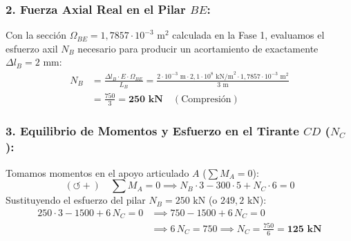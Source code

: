 \subsubsection*{2. Fuerza Axial Real en el Pilar $BE$:}
Con la sección $\Omega_{BE} = 1{,}7857 \cdot 10^{-3}\text{ m}^2$ calculada en la Fase 1, evaluamos el esfuerzo axil $N_B$ necesario para producir un acortamiento de exactamente $\Delta l_B = 2\text{ mm}$:
\begin{align}
    N_B & = \frac{\Delta l_B \cdot E \cdot \Omega_{BE}}{L_B} = \frac{2 \cdot 10^{-3}\text{ m} \cdot 2{,}1 \cdot 10^8\text{ kN/m}^2 \cdot 1{,}7857 \cdot 10^{-3}\text{ m}^2}{3\text{ m}} \nonumber \\
        & = \frac{750}{3} = \mathbf{250\text{ kN}} \quad (\text{Compresión})
\end{align}

\subsubsection*{3. Equilibrio de Momentos y Esfuerzo en el Tirante $CD$ ($N_C$):}
Tomamos momentos en el apoyo articulado $A$ ($\sum M_A = 0$):
\begin{equation}
    (\circlearrowleft +) \quad \sum M_A = 0 \implies N_B \cdot 3 - 300 \cdot 5 + N_C \cdot 6 = 0
\end{equation}
Sustituyendo el esfuerzo del pilar $N_B = 250\text{ kN}$ (o $249{,}2\text{ kN}$):
\begin{align}
    250 \cdot 3 - 1500 + 6\,N_C = 0 & \implies 750 - 1500 + 6\,N_C = 0 \nonumber \\
                                    & \implies 6\,N_C = 750 \implies \boxed{N_C = \frac{750}{6} = \mathbf{125\text{ kN}}}
\end{align}

